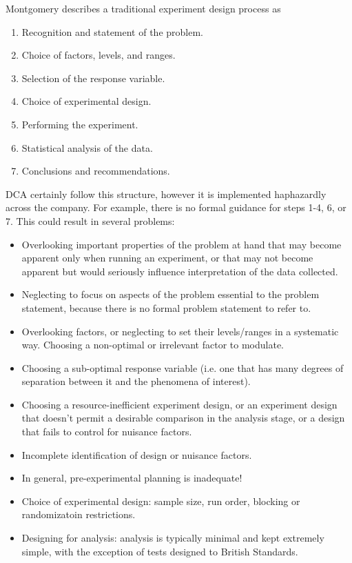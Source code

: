 \documentclass[11pt,a4paper,article]{memoir} %
\begin{document}
Montgomery describes a traditional experiment design process as
\begin{enumerate}
\item Recognition and statement of the problem.
\item Choice of factors, levels, and ranges.
\item Selection of the response variable.
\item Choice of experimental design.
\item Performing the experiment.
\item Statistical analysis of the data.
\item Conclusions and recommendations.
\end{enumerate}
DCA certainly follow this structure, however it is implemented haphazardly across the company. For example, there is no formal guidance for steps 1-4, 6, or 7. This could result in several problems:
\begin{itemize}
\item Overlooking important properties of the problem at hand that may become apparent only when running an experiment, or that may not become apparent but would seriously influence interpretation of the data collected.
\item Neglecting to focus on aspects of the problem essential to the problem statement, because there is no formal problem statement to refer to.
\item Overlooking factors, or neglecting to set their levels/ranges in a systematic way. Choosing a non-optimal or irrelevant factor to modulate.
\item Choosing a sub-optimal response variable (i.e. one that has many degrees of separation between it and the phenomena of interest).
\item Choosing a resource-inefficient experiment design, or an experiment design that doesn't permit a desirable comparison in the analysis stage, or a design that fails to control for nuisance factors.
\item Incomplete identification of design or nuisance factors.
\item In general, pre-experimental planning is inadequate!
\item Choice of experimental design: sample size, run order, blocking or randomizatoin restrictions. 
\item Designing for analysis: analysis is typically minimal and kept extremely simple, with the exception of tests designed to British Standards.
\end{itemize}
\end{document}
